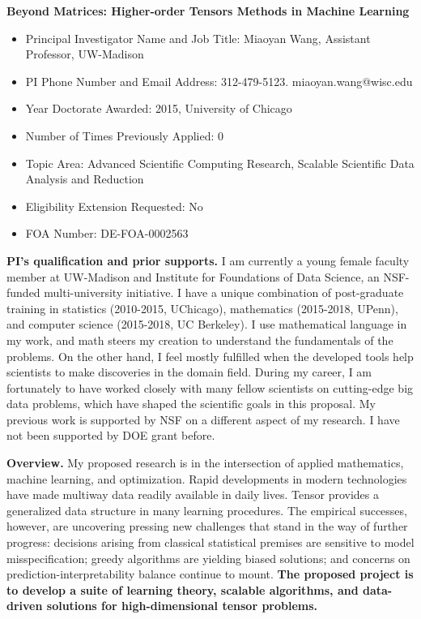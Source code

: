 \documentclass[11pt]{article}
\theoremstyle{plain}
\theoremstyle{definition}
\begin{document}
\begin{center}
\vspace{.2cm}
{\bf \large Beyond Matrices: Higher-order Tensors Methods in Machine Learning}\\
\end{center}
\vspace{.2cm}
\begin{itemize}[wide,noitemsep,topsep=0pt]
\item Principal Investigator Name and Job Title: Miaoyan Wang, Assistant Professor, UW-Madison
\item PI Phone Number and Email Address: 312-479-5123. miaoyan.wang@wisc.edu
\item Year Doctorate Awarded: 2015, University of Chicago
\item Number of Times Previously Applied: 0
\item Topic Area: Advanced Scientific Computing Research, Scalable Scientific Data Analysis and Reduction
\item Eligibility Extension Requested: No
\item FOA Number: DE-FOA-0002563
\end{itemize}


{\bf PI's qualification and prior supports.} I am currently a young female faculty member at UW-Madison and Institute for Foundations of Data Science, an NSF-funded multi-university initiative. I have a unique combination of post-graduate training in statistics (2010-2015, UChicago), mathematics (2015-2018, UPenn), and computer science (2015-2018, UC Berkeley). I use mathematical language in my work, and math steers my creation to understand the fundamentals of the problems. On the other hand, I feel mostly fulfilled when the developed tools help scientists to make discoveries in the domain field. During my career, I am fortunately to have worked closely with many fellow scientists on cutting-edge big data problems, which have shaped the scientific goals in this proposal. My previous work is supported by NSF on a different aspect of my research. I have not been supported by DOE grant before. 

{\bf Overview.} My proposed research is in the intersection of applied mathematics, machine learning, and optimization. Rapid developments in modern technologies have made multiway data readily available in daily lives. Tensor provides a generalized data structure in many learning procedures. %
The empirical successes, however, are uncovering pressing new challenges that stand in the way of further progress: decisions arising from classical statistical premises are sensitive to model misspecification; greedy algorithms are yielding biased solutions; and concerns on prediction-interpretability balance continue to mount. {\bf The proposed project is to develop a suite of learning theory, scalable algorithms, and data-driven solutions for high-dimensional tensor problems.}
\end{document}
